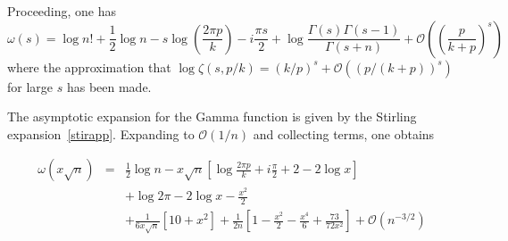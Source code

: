 \documentclass{amsart}
\begin{document}
Proceeding, one has 
\begin{equation}
\omega(s)=\log n!+\frac{1}{2}\log n
-s\log\left(\frac{2\pi p}{k}\right)-i\frac{\pi s}{2}
+\log\frac{\Gamma(s)\Gamma(s-1)}{\Gamma(s+n)}
+\mathcal{O}\left( \left(\frac{p}{k+p}\right)^s \right)
\end{equation}
 where the approximation that 
$\log \zeta\left(s,p/k\right)=(k/p)^{s}+\mathcal{O}\left( (p/(k+p))^s \right)$
for large $s$ has been made. 

The asymptotic expansion for the Gamma function is given by the Stirling
expansion~\eqref{stirapp}.
Expanding to $\mathcal{O}(1/n)$
and collecting terms, one obtains 

\begin{eqnarray}
\omega(x\sqrt{n}) & = & \frac{1}{2}\log n
-x\sqrt{n}\left[\log\frac{2\pi p}{k}+i\frac{\pi}{2}+2-2\log x\right] \\
 &  & +\log2\pi-2\log x-\frac{x^{2}}{2} \\
 &  & +\frac{1}{6x\sqrt{n}}\left[10+x^{2}\right]
+\frac{1}{2n}\left[1-\frac{x^{2}}{2}-\frac{x^{4}}{6}
+\frac{73}{72x^{2}}\right]
+\mathcal{O}\left(n^{-3/2}\right)
\end{eqnarray}
\end{document}
